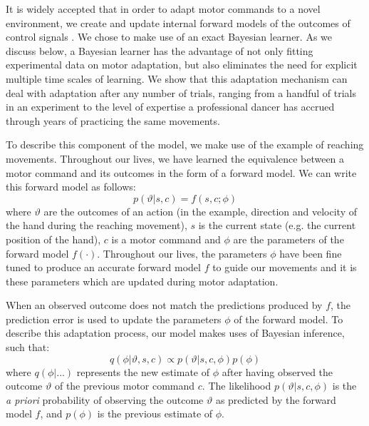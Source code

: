 \documentclass[a4paper,doc,floatsintext,natbib]{apa6}
\begin{document}
It is widely accepted that in order to adapt motor commands to a novel environment, we create and update internal forward models of the outcomes of control signals \citep{Wolpert_Multiple_1998}. We chose to make use of an exact Bayesian learner. As we discuss below, a Bayesian learner has the advantage of not only fitting experimental data on motor adaptation, but also eliminates the need for explicit multiple time scales of learning. We show that this adaptation mechanism can deal with adaptation after any number of trials, ranging from a handful of trials in an experiment to the level of expertise a professional dancer has accrued through years of practicing the same movements.

To describe this component of the model, we make use of the example of reaching movements. Throughout our lives, we have learned the equivalence between a motor command and its outcomes in the form of a forward model. We can write this forward model as follows:
\begin{equation}
p(\vartheta | s, c) = f(s, c; \phi) \label{eqn:forward-model}
\end{equation}
where $\vartheta$ are the outcomes of an action (in the example, direction and velocity of the hand during the reaching movement), $s$ is the current state (e.g. the current position of the hand), $c$ is a motor command and $\phi$ are the parameters of the forward model $f(\cdot)$. Throughout our lives, the parameters $\phi$ have been fine tuned to produce an accurate forward model $f$ to guide our movements and it is these parameters which are updated during motor adaptation.

When an observed outcome does not match the predictions produced by $f$, the prediction error is used to update the parameters $\phi$ of the forward model. To describe this adaptation process, our model makes uses of Bayesian inference, such that:
\begin{equation}
q(\phi | \vartheta, s, c) \propto p(\vartheta | s, c, \phi)p(\phi)
\end{equation}
where $q(\phi | ...)$ represents the new estimate of $\phi$ after having observed the outcome $\vartheta$ of the previous motor command $c$. The likelihood $p(\vartheta | s, c, \phi)$ is the \textit{a priori} probability of observing the outcome $\vartheta$ as predicted by the forward model $f$, and $p(\phi)$ is the previous estimate of $\phi$.
\end{document}
